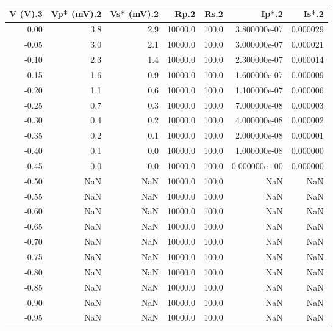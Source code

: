 \begin{tabular}{rrrrrrr}
\toprule
 V (V).3 &  Vp* (mV).2 &  Vs* (mV).2 &    Rp.2 &  Rs.2 &        Ip*.2 &    Is*.2 \\
\midrule
    0.00 &         3.8 &         2.9 & 10000.0 & 100.0 & 3.800000e-07 & 0.000029 \\
   -0.05 &         3.0 &         2.1 & 10000.0 & 100.0 & 3.000000e-07 & 0.000021 \\
   -0.10 &         2.3 &         1.4 & 10000.0 & 100.0 & 2.300000e-07 & 0.000014 \\
   -0.15 &         1.6 &         0.9 & 10000.0 & 100.0 & 1.600000e-07 & 0.000009 \\
   -0.20 &         1.1 &         0.6 & 10000.0 & 100.0 & 1.100000e-07 & 0.000006 \\
   -0.25 &         0.7 &         0.3 & 10000.0 & 100.0 & 7.000000e-08 & 0.000003 \\
   -0.30 &         0.4 &         0.2 & 10000.0 & 100.0 & 4.000000e-08 & 0.000002 \\
   -0.35 &         0.2 &         0.1 & 10000.0 & 100.0 & 2.000000e-08 & 0.000001 \\
   -0.40 &         0.1 &         0.0 & 10000.0 & 100.0 & 1.000000e-08 & 0.000000 \\
   -0.45 &         0.0 &         0.0 & 10000.0 & 100.0 & 0.000000e+00 & 0.000000 \\
   -0.50 &         NaN &         NaN & 10000.0 & 100.0 &          NaN &      NaN \\
   -0.55 &         NaN &         NaN & 10000.0 & 100.0 &          NaN &      NaN \\
   -0.60 &         NaN &         NaN & 10000.0 & 100.0 &          NaN &      NaN \\
   -0.65 &         NaN &         NaN & 10000.0 & 100.0 &          NaN &      NaN \\
   -0.70 &         NaN &         NaN & 10000.0 & 100.0 &          NaN &      NaN \\
   -0.75 &         NaN &         NaN & 10000.0 & 100.0 &          NaN &      NaN \\
   -0.80 &         NaN &         NaN & 10000.0 & 100.0 &          NaN &      NaN \\
   -0.85 &         NaN &         NaN & 10000.0 & 100.0 &          NaN &      NaN \\
   -0.90 &         NaN &         NaN & 10000.0 & 100.0 &          NaN &      NaN \\
   -0.95 &         NaN &         NaN & 10000.0 & 100.0 &          NaN &      NaN \\

\end{tabular}
